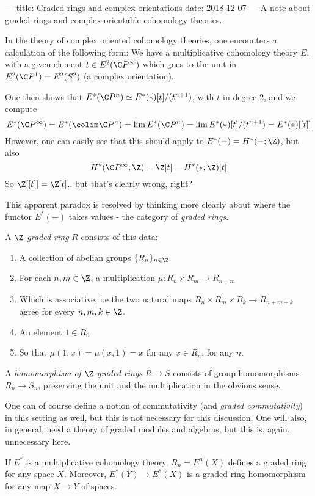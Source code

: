 ---
title: Graded rings and complex orientations
date: 2018-12-07
---
A note about graded rings and complex orientable cohomology theories.

In the theory of complex oriented cohomology theories, one encounters a calculation of the following form:
We have a multiplicative cohomology theory $E$, with a given element $t \in E^2(\C P^\infty)$ which goes to the unit
in $E^2(\C P^1) = E^2(S^2)$ (a complex orientation).

One then shows that $E^*(\C P^n) \simeq E^*(\ast)[t]/(t^{n+1})$, with $t$ in degree $2$, and we compute
\[E^*(\C P^\infty) = E^*(\colim \C P^n) = \lim E^*(\C P^n) = \lim E^*(\ast)[t]/(t^{n+1}) = E^*(\ast)[[t]]\]
However, one can easily see that this should apply to
$E^*(-) = H^*(-;\Z)$, but also
\[H^*(\C P^\infty;\Z) = \Z[t] = H^*(\ast;\Z)[t]\]
So $\Z[[t]] = \Z[t]$.. but that's clearly wrong, right?

This apparent paradox is resolved by thinking more clearly about where the functor $E^*(-)$ takes values - the category of \emph{graded rings}.

\begin{definition}
  A \emph{$\Z$-graded ring} $R$ consists of this data:
  \begin{enumerate}
    \item A collection of abelian groups $\{R_n\}_{n\in\Z}$
    \item For each $n,m\in\Z$, a multiplication $\mu: R_n \times R_m \to R_{n+m}$
    \item Which is associative, i.e the two natural maps $R_n \times R_m \times R_k \to R_{n+m+k}$ agree for every $n,m,k\in \Z$.
    \item An element $1 \in R_0$
    \item So that $\mu(1,x) = \mu(x,1) = x$ for any $x\in R_n$, for any $n$.
  \end{enumerate}

  A \emph{homomorphism of $\Z$-graded rings} $R \to S$ consists of group homomorphisms $R_n \to S_n$, preserving the unit and the multiplication in the obvious sense.
\end{definition}

One can of course define a notion of commutativity (and \emph{graded commutativity}) in this setting as well, but this is not necessary for this discussion.
One will also, in general, need a theory of graded modules and algebras, but this is, again, unnecessary here.

\begin{example}
  If $E^*$ is a multiplicative cohomology theory, $R_n = E^n(X)$ defines a graded ring for any space $X$.
  Moreover, $E^*(Y) \to E^*(X)$ is a graded ring homomorphism for any map $X \to Y$ of spaces.
\end{example}

